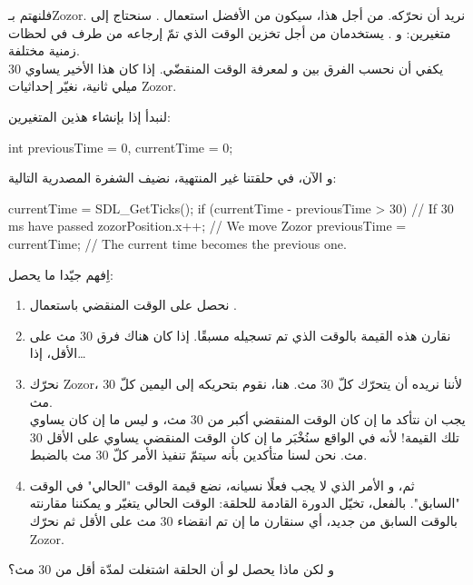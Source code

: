 فلنهتم بـ\textenglish{Zozor}.
نريد أن نحرّكه. من أجل هذا، سيكون من الأفضل استعمال 
.
سنحتاج إلى متغيرين: 
و 
.
يستخدمان من أجل تخزين الوقت الذي تمّ إرجاعه من طرف 
في لحظات زمنية مختلفة.\\
يكفي أن نحسب الفرق بين 
و
لمعرفة الوقت المنقضّي. إذا كان هذا الأخير يساوي 30 ميلي ثانية، نغيّر إحداثيات 
\textenglish{Zozor}.

لنبدأ إذا بإنشاء هذين المتغيرين:

\begin{Csource}
int previousTime = 0, currentTime = 0;
\end{Csource}

و الآن، في حلقتنا غير المنتهية، نضيف الشفرة المصدرية التالية:

\begin{Csource}
currentTime = SDL_GetTicks();
if (currentTime - previousTime > 30) // If 30 ms have passed
{
	zozorPosition.x++; // We move Zozor
	previousTime = currentTime; // The current time becomes the previous one.
}
\end{Csource}

اِفهم جيّدا ما يحصل:

\begin{enumerate}
	\item نحصل على الوقت المنقضي باستعمال
	.
	\item نقارن هذه القيمة بالوقت الذي تم تسجيله مسبقًا. إذا كان هناك فرق 30 مث على الأقل، إذا\dots
	\item نحرّك
	\textenglish{Zozor}،
	لأننا نريده أن يتحرّك كلّ 30 مث. هنا، نقوم بتحريكه إلى اليمين كلّ 30 مث. \\
	يجب ان نتأكد ما إن كان الوقت المنقضي أكبر من 30 مث، و ليس ما إن كان يساوي تلك القيمة! لأنه في الواقع سنُخْبَر ما إن كان الوقت المنقضي يساوي على الأقل 30 مث. نحن لسنا متأكدين بأنه سيتمّ تنفيذ الأمر كلّ 30 مث بالضبط.
	\item ثم، و الأمر الذي لا يجب فعلًا نسيانه، نضع قيمة الوقت "الحالي" في الوقت "السابق". بالفعل، تخيّل الدورة القادمة للحلقة: الوقت الحالي يتغيّر و يمكننا مقارنته بالوقت السابق من جديد، أي سنقارن ما إن تم انقضاء 30 مث على الأقل ثم نحرّك
	\textenglish{Zozor}.
\end{enumerate}

\begin{question}
و لكن ماذا يحصل لو أن الحلقة اشتغلت لمدّة أقل من 30 مث؟
\end{question}

